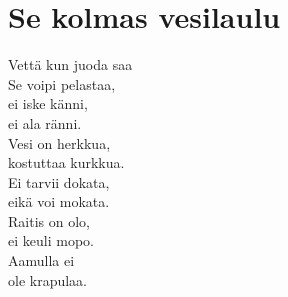 \section{Se kolmas vesilaulu}

Vettä kun juoda saa\\
Se voipi pelastaa,\\
ei iske känni,\\
ei ala ränni.\\
Vesi on herkkua,\\
kostuttaa kurkkua.\\
Ei tarvii dokata,\\
eikä voi mokata.\\
Raitis on olo,\\
ei keuli mopo.\\
Aamulla ei\\
ole krapulaa.